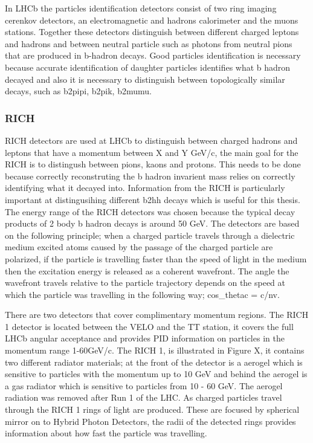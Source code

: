 In LHCb the particles identification detectors consist of two ring imaging cerenkov detectors, an electromagnetic and hadrons calorimeter and the muons stations. Together these detectors distinguish between different charged leptons and hadrons and between neutral particle such as photons from neutral pions that are produced in b-hadron decays. Good particles identification is necessary because accurate identification of daughter particles identifies what b hadron decayed and also it is necessary to distinguish between topologically similar decays, such as b2pipi, b2pik, b2mumu. %
\subsubsection{RICH}
\label{RICH}

RICH detectors are used at LHCb to distinguish between charged hadrons and leptons that have a momentum between X and Y GeV/c, the main goal for the RICH is to distingush between pions, kaons and protons. This needs to be done because correctly reconstruting the b hadron invarient mass relies on correctly identifying what it decayed into. Information from the RICH is particularly important at distingusihing different b2hh decays which is useful for this thesis. The energy range of the RICH detectors was chosen because the typical decay products of 2 body b hadron decays is around 50 GeV. The detectors are based on the following principle; when a charged particle travels through a dielectric medium excited atoms caused by the passage of the charged particle are polarized, if the particle is travelling faster than the speed of light in the medium then the excitation energy is released as a coherent wavefront. The angle the wavefront travels relative to the particle trajectory depends on the speed at which the particle was travelling in the following way;
cos_thetac = c/nv. 

There are two detectors that cover complimentary momentum regions. The RICH 1 detector is located between the VELO and the TT station, it covers the full LHCb angular acceptance and provides PID information on particles in the momentum range 1-60GeV/c. The RICH 1, is illustrated in Figure X, it contains two different radiator materials; at the front of the detector is a aerogel which is sensitive to particles with the momentum up to 10 GeV and behind the aerogel is a gas radiator which is sensitive to particles from 10 - 60 GeV. The aerogel radiation was removed after Run 1 of the LHC. As charged particles travel through the RICH 1 rings of light are produced. These are focused by spherical mirror on to Hybrid Photon Detectors, the radii of the detected rings provides information about how fast the particle was travelling. %

